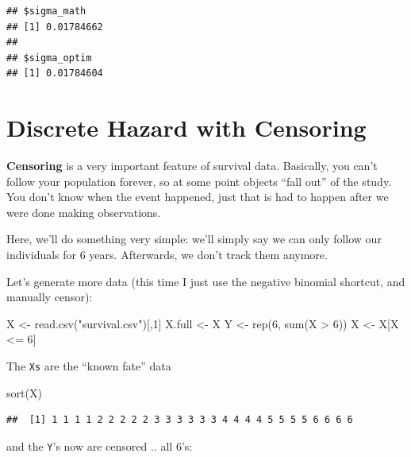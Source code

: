 \documentclass[]{tufte-handout}
\newenvironment{Shaded}{}{}
\newcommand{\DecValTok}[1]{\textcolor[rgb]{0.25,0.63,0.44}{#1}}
\newcommand{\FunctionTok}[1]{\textcolor[rgb]{0.02,0.16,0.49}{#1}}
\newcommand{\NormalTok}[1]{#1}
\newcommand{\OtherTok}[1]{\textcolor[rgb]{0.00,0.44,0.13}{#1}}
\newcommand{\SpecialCharTok}[1]{\textcolor[rgb]{0.25,0.44,0.63}{#1}}
\newcommand{\StringTok}[1]{\textcolor[rgb]{0.25,0.44,0.63}{#1}}
\begin{document}
\begin{verbatim}
## $sigma_math
## [1] 0.01784662
## 
## $sigma_optim
## [1] 0.01784604
\end{verbatim}

\section{Discrete Hazard with
Censoring}\label{discrete-hazard-with-censoring}

\textbf{Censoring} is a very important feature of survival data.
Basically, you can't follow your population forever, so at some point
objects ``fall out'' of the study. You don't know when the event
happened, just that is had to happen after we were done making
observations.

Here, we'll do something very simple: we'll simply say we can only
follow our individuals for 6 years. Afterwards, we don't track them
anymore.

Let's generate more data (this time I just use the negative binomial
shortcut, and manually censor):

\begin{Shaded}
\begin{Highlighting}[]
\NormalTok{X }\OtherTok{\textless{}{-}} \FunctionTok{read.csv}\NormalTok{(}\StringTok{"survival.csv"}\NormalTok{)[,}\DecValTok{1}\NormalTok{]}
\NormalTok{X.full }\OtherTok{\textless{}{-}}\NormalTok{ X}
\NormalTok{Y }\OtherTok{\textless{}{-}} \FunctionTok{rep}\NormalTok{(}\DecValTok{6}\NormalTok{, }\FunctionTok{sum}\NormalTok{(X }\SpecialCharTok{\textgreater{}} \DecValTok{6}\NormalTok{))}
\NormalTok{X }\OtherTok{\textless{}{-}}\NormalTok{ X[X }\SpecialCharTok{\textless{}=} \DecValTok{6}\NormalTok{]}
\end{Highlighting}
\end{Shaded}

The \texttt{X\textquotesingle{}s} are the ``known fate'' data

\begin{Shaded}
\begin{Highlighting}[]
\FunctionTok{sort}\NormalTok{(X)}
\end{Highlighting}
\end{Shaded}

\begin{verbatim}
##  [1] 1 1 1 1 2 2 2 2 2 3 3 3 3 3 3 4 4 4 4 5 5 5 5 6 6 6 6
\end{verbatim}

and the \texttt{Y}'s now are censored .. all 6's:
\end{document}
